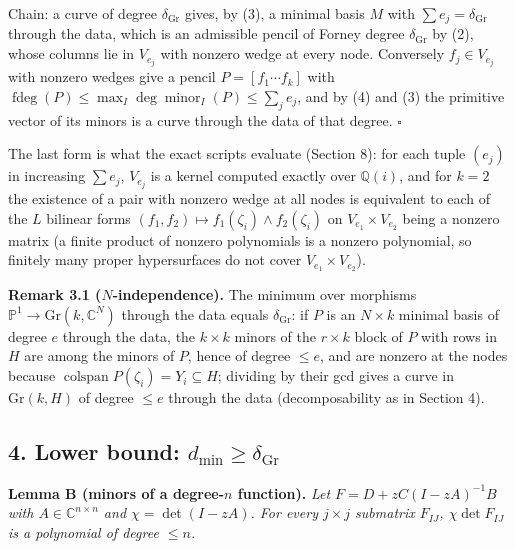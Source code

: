 \documentclass[
  11pt,
  a4paper,
]{article}
\begin{document}
Chain: a curve of degree \(\delta_{\mathrm{Gr}}\) gives, by (3), a
minimal basis \(M\) with \(\sum e_j=\delta_{\mathrm{Gr}}\) through the
data, which is an admissible pencil of Forney degree
\(\delta_{\mathrm{Gr}}\) by (2), whose columns lie in \(V_{e_j}\) with
nonzero wedge at every node. Conversely \(f_j\in V_{e_j}\) with nonzero
wedges give a pencil \(P=[f_1\cdots f_k]\) with
\(\operatorname{fdeg}(P)\le\max_I\deg\operatorname{minor}_I(P)\le\sum_je_j\),
and by (4) and (3) the primitive vector of its minors is a curve through
the data of that degree. \(\square\)

The last form is what the exact scripts evaluate (Section 8): for each
tuple \((e_j)\) in increasing \(\sum e_j\), \(V_{e_j}\) is a kernel
computed exactly over \(\mathbb Q(i)\), and for \(k=2\) the existence of
a pair with nonzero wedge at all nodes is equivalent to each of the
\(L\) bilinear forms
\((f_1,\allowbreak{}f_2)\mapsto f_1(\zeta_i)\wedge f_2(\zeta_i)\) on
\(V_{e_1}\times V_{e_2}\) being a nonzero matrix (a finite product of
nonzero polynomials is a nonzero polynomial, so finitely many proper
hypersurfaces do not cover \(V_{e_1}\times V_{e_2}\)).

\textbf{Remark 3.1 (\(N\)-independence).} The minimum over morphisms
\(\mathbb P^1\to\mathrm{Gr}(k,\allowbreak{}\mathbb C^N)\) through the data equals
\(\delta_{\mathrm{Gr}}\): if \(P\) is an \(N\times k\) minimal basis of
degree \(e\) through the data, the \(k\times k\) minors of the
\(r\times k\) block of \(P\) with rows in \(H\) are among the minors of
\(P\), hence of degree \(\le e\), and are nonzero at the nodes because
\(\operatorname{colspan}P(\zeta_i)=Y_i\subseteq H\); dividing by their
gcd gives a curve in \(\mathrm{Gr}(k,\allowbreak{}H)\) of degree \(\le e\) through
the data (decomposability as in Section 4).

\subsection{\texorpdfstring{4. Lower bound:
\(d_{\min}\ge\delta_{\mathrm{Gr}}\)}{4. Lower bound: d\_\{\textbackslash min\}\textbackslash ge\textbackslash delta\_\{\textbackslash mathrm\{Gr\}\}}}\label{lower-bound-d_mingedelta_mathrmgr}

\textbf{Lemma B (minors of a degree-\(n\) function).} \emph{Let
\(F=D+zC(I-zA)^{-1}B\) with \(A\in\mathbb C^{n\times n}\) and
\(\chi=\det(I-zA)\). For every \(j\times j\) submatrix \(F_{IJ}\),
\(\chi\det F_{IJ}\) is a polynomial of degree \(\le n\).}
\end{document}
